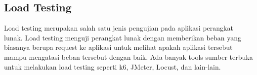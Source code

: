   \subsection{Load Testing}
  Load testing merupakan salah satu jenis pengujian pada aplikasi perangkat lunak. Load testing menguji perangkat lunak dengan memberikan beban yang biasanya berupa request ke aplikasi untuk melihat apakah aplikasi tersebut mampu mengatasi beban tersebut dengan baik. Ada banyak tools sumber terbuka untuk melakukan load testing seperti k6, JMeter, Locust, dan lain-lain.